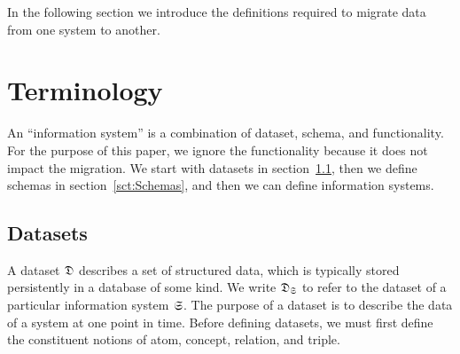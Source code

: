 \documentclass{elsarticle}
\begin{document}


   

   In the following section we introduce the definitions required to migrate data from one system to another.

\section{Terminology}
\label{sct:Terminology}
   An ``information system'' is a combination of dataset, schema, and functionality.
   For the purpose of this paper, we ignore the functionality because it does not impact the migration.
   We start with datasets in section~\ref{sct:Datasets}, then we define schemas in section~\ref{sct:Schemas},
   and then we can define information systems.

\subsection{Datasets}
\label{sct:Datasets}
   A dataset $\mathfrak{D}$ describes a set of structured data, which is typically stored persistently in a database of some kind.
   We write $\mathfrak{D}_{\mathfrak{S}}$ to refer to the dataset of a particular information system $\mathfrak{S}$.
   The purpose of a dataset is to describe the data of a system at one point in time. 
   Before defining datasets, we must first define the constituent notions of atom, concept, relation, and triple.
   
\end{document}
